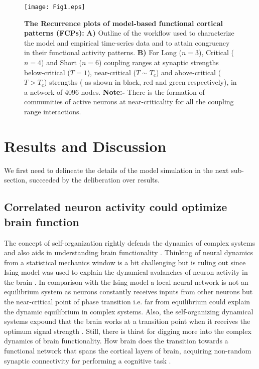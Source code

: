 \documentclass[preprintnumbers,amsmath,amssymb,onecolumn]{revtex4}
\begin{document}
\begin{figure}
\label{fig1}
\begin{center}
\texttt{[image: Fig1.eps]}
\caption{\textbf{The Recurrence plots of model-based functional cortical patterns (FCPs):} \textbf{A)} Outline of the workflow used to characterize the model and empirical time-series data and to attain congruency in their functional activity patterns.
\textbf{B)} For Long ($n=3$), Critical ($n=4$) and Short ($n=6$) coupling
ranges at synaptic strengths below-critical ($T = 1$), near-critical
($T\sim T_{c}$) and above-critical ($T > T_{c}$) strengths ( as
shown in black, red and green respectively), in a network of 4096
nodes. \textbf{Note:- } There is the formation of communities of active
neurons at near-criticality for all the coupling range interactions.} 
\end{center}
\end{figure}

\vskip 0.5cm
\section{Results and Discussion}

We first need to delineate the details of the model simulation in the next sub-section, succeeded by the deliberation over results.

\subsection{Correlated neuron activity could optimize brain function}

{\noindent}The concept of self-organization rightly defends the dynamics of complex systems \citep{kauffman1993} and also aids in understanding brain functionality \citep{bassett2011}. Thinking of neural dynamics from a statistical mechanics window is a bit challenging but is ruling out since Ising model was used to explain the dynamical avalanches of neuron activity in the brain \citep{Chialvo2010,Eguiluz2005a}. In comparison with the Ising model a local neural network is not an equilibrium system as neurons constantly receives inputs from other neurons but the near-critical point of phase transition i.e. far from equilibrium could explain the dynamic equilibrium in complex systems. Also, the self-organizing dynamical systems expound that the brain works at a transition point when it receives the optimum signal strength \citep{Beggs2012}. Still, there is thirst for digging more into the complex dynamics of brain functionality. How brain does the transition towards a functional network that spans the cortical layers of brain, acquiring non-random synaptic connectivity for performing a cognitive task \citep{Song2005}.\\
\end{document}
